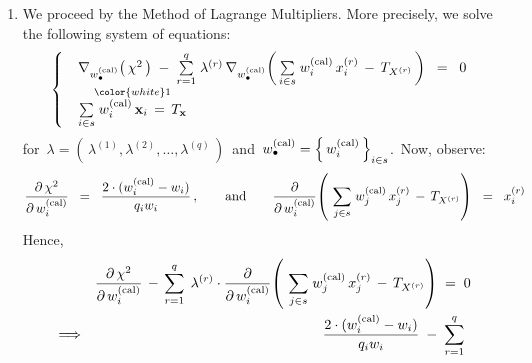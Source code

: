 \begin{enumerate}
\item
    We proceed by the Method of Lagrange Multipliers.
    More precisely, we solve the following system of equations:
    \begin{equation*}
    \left\{\;\;\begin{array}{l}
    \nabla_{w_{\bullet}^{\textnormal{(cal)}}}\!\left(\,
        \chi^{2}
        \,\right)
    \; - \;
    \overset{q}{\underset{r = 1}{\sum}}\;\lambda^{(r)}\,
        \nabla_{w_{\bullet}^{\textnormal{(cal)}}}\!\left(\,
            \underset{i \in s}{\sum}\;
            w^{\textnormal{(cal)}}_{i}\,x^{(r)}_{i}
            \,-\,
            T_{X^{(r)}}
            \,\right)
    \;\; = \;\;
        0
    \\
    \overset{{\color{white}1}}{
        \underset{i \in s}{\sum}\;
            w^{\textnormal{(cal)}}_{i}\,\mathbf{x}_{i}
            \,=\,
            T_{\mathbf{x}}
        }
    \end{array}\right.
    \end{equation*}
    for
    \,$\lambda = \left(\,\lambda^{(1)},\lambda^{(2)},\ldots,\lambda^{(q)}\,\right)$\,
    and
    \,$w^{\textnormal{(cal)}}_{\bullet} = \left\{\,w^{\textnormal{(cal)}}_{i}\,\right\}_{i \in s}$.\,
    \vskip 0.1cm
    \noindent
    Now, observe:
    \begin{equation*}
    \dfrac{\partial\,\chi^{2}}{\partial\,w_{i}^{\textnormal{(cal)}}}
    \;\; = \;\;
        \dfrac{2\cdot(w_{i}^{\textnormal{(cal)}} - w_{i})}{q_{i}w_{i}}\,,
    \quad\quad\textnormal{and}\quad\quad
    \dfrac{\partial}{\partial\,w_{i}^{\textnormal{(cal)}}}\!\left(\ 
        \underset{j \in s}{\sum}\;
        w^{\textnormal{(cal)}}_{j}\,x^{(r)}_{j}
        \,-\,
        T_{X^{(r)}}
        \right)
    \;\; = \;\;
        x^{(r)}_{i}
    \end{equation*}
    Hence,
    \begin{eqnarray*}
    &&
        \dfrac{\partial\,\chi^{2}}{\partial\,w_{i}^{\textnormal{(cal)}}}
        \,-\,
        \overset{q}{\underset{r = 1}{\sum}}\;\,
        \lambda^{(r)} \cdot \dfrac{\partial}{\partial\,w_{i}^{\textnormal{(cal)}}}\!\left(\ 
            \underset{j \in s}{\sum}\;
            w^{\textnormal{(cal)}}_{j}\,x^{(r)}_{j}
            \,-\,
            T_{X^{(r)}}
            \right)
        \; = \;
            0
    \\
    & \Longrightarrow &
        \dfrac{2\cdot(w_{i}^{\textnormal{(cal)}} - w_{i})}{q_{i}w_{i}}
        \; - \;
        \overset{q}{\underset{r = 1}{\sum}}\;\,

\end{eqnarray*}
\end{enumerate}
